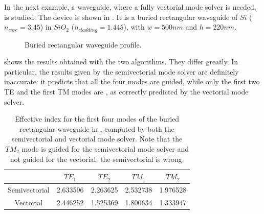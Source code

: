 In the next example, a waveguide, where a fully vectorial mode solver
is needed, is studied. The device is shown in . It
is a buried rectangular waveguide of $Si$ ($n_{core} = 3.45$) in $SiO_2$
($n_{cladding} = 1.445$), with $w = 500 nm$ and $h = 220 nm$.

\begin{figure}[htbp]
  \begin{center}
    \resizebox{5cm}{!}{}
  \end{center}
  \caption{Buried rectangular waveguide profile.}
  \label{fig:plabs}
\end{figure}

 shows the results obtained with the two
algorithms. They differ greatly. In particular, the results given by
the semivectorial mode solver are definitely inaccurate: it predicts
that all the four modes are guided, while only the first two TE and
the first TM modes are \cite{plabs}, as correctly predicted by the
vectorial mode solver.

\begin{table}[htbp]
  \begin{center}
    \begin{tabular}{|*{5}{c|}}
      \hline
      & $TE_1$ & $TE_2$ & $TM_1$ & $TM_2$ \\
      \hline
      Semivectorial & 2.633596 & 2.263625 & 2.532738 & 1.976528 \\
      Vectorial & 2.446252 & 1.525369 & 1.800634 & 1.333947 \\
      \hline
    \end{tabular}
  \end{center}
  \caption{Effective index for the first four modes of the buried
    rectangular waveguide in , computed by both the
    semivectorial and vectorial mode solver. Note that the $TM_2$ mode
    is guided for the semivectorial mode solver and not guided for the
    vectorial: the semivectorial is wrong.}
  \label{tab:plabs}
\end{table}

